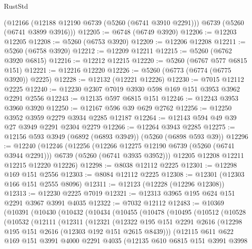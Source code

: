 \begin{lexlean}{RustStd}
\begin{coremodule}
    (@12166 (@12188 @12190 @6739 (@5260 (@6741 @3910 @2291))) @6739 (@5260 (@6741 @3899 @3916)))
@12205 := @6748 (@6749 @3920)
@12206 := @12203 @12205
@12208 := @5260 (@6753 @3920)
@12209 := @12206 @12208
@12211 := @5260 (@6758 @3920)
@12212 := @12209 @12211
@12215 := @5260 (@6762 @3920 @6815)
@12216 := @12212 @12215
@12220 := @5260 (@6767 @577 @6815 @151)
@12221 := @12216 @12220
@12226 := @5260 (@6773 (@6774 (@6775 @3920)) @2225)
@12228 := @12132 (@12221 @12226)
@12230 := @7015 @12112 @2225
@12240 := @12230 @2307 @7019 @3930 @598 @169 @151 @3953 @3962 @2291 @2556
@12243 := @12135 @597 @6815 @151
@12246 := @12243 @3953 @3960 @3920
@12250 := @12167 @596 @39 @629 @2762
@12256 := @12250 @3952 @3959 @2279 @3934 @2285 @12187
@12264 := @12143 @594 @49 @39 @27 @3949 @2291 @2304 @2279
@12266 := @12264 @3943 @2285
@12275 := @12156 @593 @3949 (@6892 (@6893 @3949)) (@5260 (@6898 @593 @39))
@12296 := @12240
    (@12246
      (@12256
        (@12266 @12275 @12190 @6739 (@5260 (@6741 @3944 @2291)))
        @6739
        (@5260 (@6741 @3935 @3952)))
      @12205
      @12208
      @12211
      @12215
      @12220
      @12226)
@12298 := @8038 @12112 @2225
@12301 := @12298 @169 @151 @2556
@12303 := @8084 @12112 @2225
@12308 := @12301 (@12303 @166 @151 @2555 @8096)
@12311 := @12123 (@12228 (@12296 @12308))
@12313 := @12230 @2225 @7019
@12321 := @12313 @3965 @195 @624 @151 @2291 @3967 @3991 @4035
@12322 := @7032 @12112
@12483 := @10369
    (@10391
      (@10430
        (@10432
          (@10434
            (@10455
              (@10478
                (@10495
                  (@10512
                    (@10528
                      (@10532
                        (@12111
                          (@12311
                            (@12321
                              (@12322
                                @195
                                @151
                                @2291
                                @2616
                                (@12298 @195 @151 @2616 (@12303 @192 @151 @2615 @8439)))
                              (@12115
                                @611
                                @622
                                @169
                                @151
                                @3991
                                @4000
                                @2291
                                @4035
                                (@12135
                                  @610
                                  @6815
                                  @151
                                  @3991
                                  @3998

\end{coremodule}
\end{lexlean}
